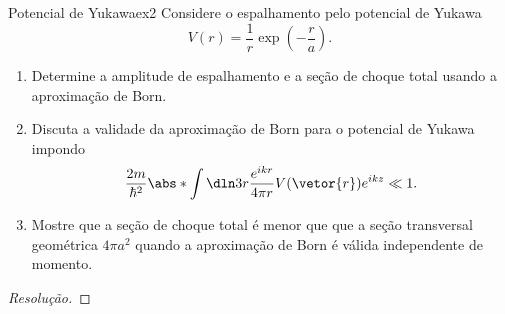 \begin{exercício}{Potencial de Yukawa}{ex2}
   Considere o espalhamento pelo potencial de Yukawa
   \begin{equation*}
      V(r) = \frac1r\exp\left(-\frac{r}{a}\right).
   \end{equation*}
   \begin{enumerate}[label=(\alph*)]
       \item Determine a amplitude de espalhamento e a seção de choque total usando a aproximação de Born.
       \item Discuta a validade da aproximação de Born para o potencial de Yukawa impondo 
          \begin{equation*}
             \frac{2m}{\hbar^2}\abs*{\int\dln3r \frac{e^{ikr}}{4\pi r} V(\vetor{r}) e^{ikz}} \ll 1.
          \end{equation*}
       \item Mostre que a seção de choque total é menor que que a seção transversal geométrica \(4\pi a^2\) quando a aproximação de Born é válida independente de momento.
   \end{enumerate}
\end{exercício}
\begin{proof}[Resolução]
    
\end{proof}
